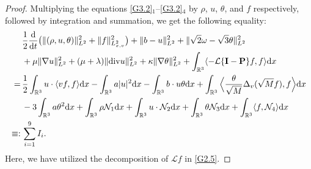 \documentclass[reqno,11pt]{amsart}
\theoremstyle{plain}
\numberwithin{equation}{section}
\begin{document}
\begin{proof}
Multiplying  the equations  \eqref{G3.2}$_1$--\eqref{G3.2}$_4$  by $\rho$, $u$, $\theta$, and $f$ respectively, followed by integration and summation, we get  the following equality:
\begin{align}\label{G3.5}
&\frac{1}{2}\frac{\rm d}{{\rm d}t}\big(\|(\rho,u,\theta)\|_{L^2}^{2} +\|f\|_{L_{x,v}^{2}}^2\big) +\|b-u\|_{L^2}^{2}+\|\sqrt{2}\omega-\sqrt{3}\theta\|_{L^2}^2 \nonumber\\
&+\mu\|\nabla u\|_{L^2}^2+(\mu+\lambda)\|{\rm div} u\|_{L^2}^2+\kappa\|\nabla\theta\|_{L^2}^2+\int_{\mathbb{R}^3} \langle-\mathcal{L}\{\mathbf{I}-\mathbf{P}\}f,f\rangle {\rm d}x \nonumber\\
=\,&\frac{1}{2}\int_{\mathbb{R}^3}u\cdot\langle vf,f\rangle{\rm d}x-\int_{\mathbb{R}^3}a|u|^2{\rm d}x-\int_{\mathbb{R}^3}b\cdot u\theta{\rm d}x+\int_{\mathbb{R}^3}\Big\langle\frac{\theta}{\sqrt{M}}\Delta_v(\sqrt{M}f),f\Big\rangle{\rm d}x
\nonumber\\
&-3\int_{\mathbb{R}^3}a\theta^2{\rm d}x+\int_{\mathbb{R}^3}\rho\mathcal{N}_1{\rm d}x+\int_{\mathbb{R}^3}u\cdot\mathcal{N}_2{\rm d}x+\int_{\mathbb{R}^3}\theta\mathcal{N}_3{\rm d}x+\int_{\mathbb{R}^3}\langle f, \mathcal{N}_4\rangle{\rm d}x\nonumber\\
\equiv:\,& \sum_{i=1}^9 I_i.
 \end{align}
Here, we have utilized the decomposition of $\mathcal{L}f$  in \eqref{G2.5}.  


\end{proof}
\end{document}
